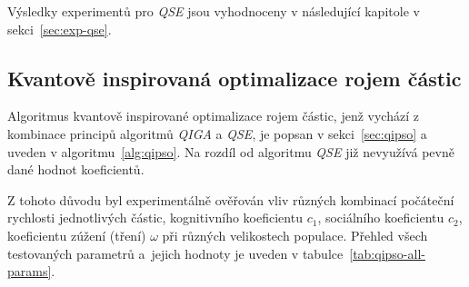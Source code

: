 Výsledky experimentů pro \emph{QSE} jsou vyhodnoceny v následující kapitole v sekci~\ref{sec:exp-qse}.

\subsection*{Kvantově inspirovaná optimalizace rojem částic}
Algoritmus kvantově inspirované optimalizace rojem částic, jenž vychází z kombinace principů algoritmů \emph{QIGA} a \emph{QSE}, je popsan v sekci~\ref{sec:qipso} a uveden v algoritmu~\ref{alg:qipso}.
Na rozdíl od algoritmu \emph{QSE} již nevyužívá pevně dané hodnot koeficientů. 

Z tohoto důvodu byl experimentálně ověřován vliv různých kombinací počáteční rychlosti jednotlivých částic, kognitivního koeficientu $c_1$, sociálního koeficientu $c_2$, koeficientu zúžení (tření) $\omega$ při různých velikostech populace. 
Přehled všech testovaných parametrů a~jejich hodnoty je uveden v tabulce~\ref{tab:qipso-all-params}.

